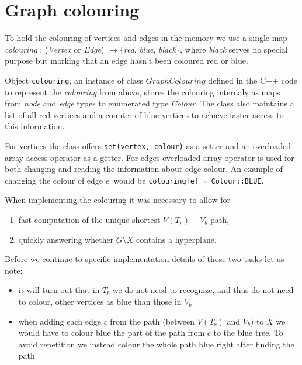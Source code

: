 \section{Graph colouring}
\label{sec:colouring}

To hold the colouring of vertices and edges in the memory we use a single map \textit{colouring} : (\textit{Vertex} or \textit{Edge}) $\rightarrow \{$\textit{red}, \textit{blue}, \textit{black}$\}$, where \textit{black} serves no special purpose but marking that an edge hasn't been coloured red or blue.

Object \lstinline|colouring|, an instance of class $GraphColouring$ defined in the C++ code to represent the \textit{colouring} from above, stores the colouring internaly as maps from \textit{node} and \textit{edge} types to enumerated type \textit{Colour}. The class also maintains a list of all red vertices and a counter of blue vertices to achieve faster access to this information.

For vertices the class offers \lstinline|set(vertex, colour)| as a setter and an overloaded array access operator as a getter. For edges overloaded array operator is used for both changing and reading the information about edge colour. An example of changing the colour of edge $e$~would be \lstinline|colouring[e] = Colour::BLUE|.

When implementing the colouring it was necessary to allow for

\begin{enumerate}
	\item fast computation of the unique shortest $V(T_r){-}V_b$ path,
	\item quickly answering whether $G \setminus X$ contains a hyperplane.
\end{enumerate}

Before we continue to specific implementation details of those two tasks let us note:

\begin{itemize}
	\item it will turn out that in $T_b$ we do not need to recognize, and thus do not need to colour, other vertices as blue than those in $V_b$

	\item when adding each edge $c$ from the path (between $V(T_r)$ and $V_b$) to $X$ we would have to colour blue the part of the path from $c$ to the blue tree. To avoid repetition we instead colour the whole path blue right after finding the path
\end{itemize}


